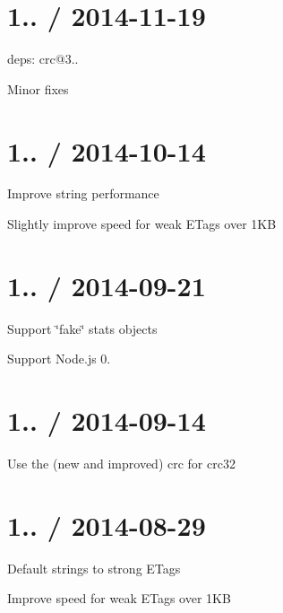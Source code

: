 \section*{1.. / 2014-\/11-\/19 }


\begin{DoxyItemize}
\item deps\+: crc@3..
\begin{DoxyItemize}
\item Minor fixes
\end{DoxyItemize}
\end{DoxyItemize}

\section*{1.. / 2014-\/10-\/14 }


\begin{DoxyItemize}
\item Improve string performance
\item Slightly improve speed for weak E\+Tags over 1\+KB
\end{DoxyItemize}

\section*{1.. / 2014-\/09-\/21 }


\begin{DoxyItemize}
\item Support \char`\"{}fake\char`\"{} stats objects
\item Support Node.\+js 0.
\end{DoxyItemize}

\section*{1.. / 2014-\/09-\/14 }


\begin{DoxyItemize}
\item Use the (new and improved) {\ttfamily crc} for crc32
\end{DoxyItemize}

\section*{1.. / 2014-\/08-\/29 }


\begin{DoxyItemize}
\item Default strings to strong E\+Tags
\item Improve speed for weak E\+Tags over 1\+KB
\end{DoxyItemize}

